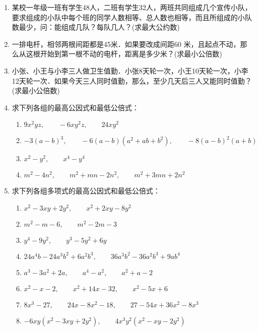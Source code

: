 \begin{enumerate}
\item 某校一年级一班有学生48人，二班有学生32人，两班共同组成几个宣传小队，要求组成的小队中每个班的同学人数相等、总人数也相等，而且所组成的小队数最少，问：能组成几队？每队几人？(求最大公约数)
\item 一排电杆，相邻两根间距都是45米．如果要改成间距60
米，且起点不动，那么从这根开始到第一根不动的电杆，距离是多少米？(求最小公倍数)
\item 小张、小王与小李三人做卫生值勤．小张8天轮一次，小王10天轮一次，小李12天轮一次．如果今天三人同时值勤，那么，至少几天后三人又能同时值勤？(求最小公倍数)
\item 求下列各组的最高公因式和最低公倍式：
\begin{enumerate}
    \item $9 x^{2} y z,\qquad -6 x y^{2} z,\qquad 24 x y^{2}$
    \item $-3(a-b)^{3},\qquad -6(a-b)\left(a^{2}+a b+b^{2}\right),\qquad -8(a-b)^{2}(a+b)$
    \item $x^{2}-y^{2},\qquad  x^{4}-y^{4}$
    \item $m^{2}-4 n^{2},\qquad  m^{2}+m n-2 n^{2},\qquad m^{2}+3 m n+2 n^{2}$
\end{enumerate}

\item 求下列各组多项式的最高公因式和最低公倍式：
\begin{enumerate}
    \item $x^{2}-3 x y+2 y^{2},\qquad  x^{2}+2 x y-8 y^{2}$
    \item  $m^{2}-m-6,\qquad  m^{2}-2 m-3 $
    \item $y^{4}-9 y^{2},\qquad  y^{3}-5 y^{2}+6 y$
    \item  $24 a^{4} b-24 a^{3} b^{2}+6 a^{2} b^{3}, \qquad  36 a^{3} b^{2}-36 a^{2} b^{3}+9 a b^{4}$
    \item ${a}^{3}-3 a^{2}+2 a,\qquad  a^{4}-a^{2},\qquad  a^{2}+a-2$
    \item  $x^{2}-x-2,\qquad  x^{2}+14 x-32,\qquad  x^{2}-5 x+6$
    \item  $8 x^{3}-27,\qquad 24 x-8 x^{2}-18,\qquad 27-54 x+36 x^{2}-8 x^{3}$ 
    \item  $-6 x y\left(x^{2}-3 x y+2 y^{2}\right),\qquad  4 x^{3} y^{2}\left(x^{2}-x y-2 y^{2}\right)$
\end{enumerate}


\end{enumerate}
